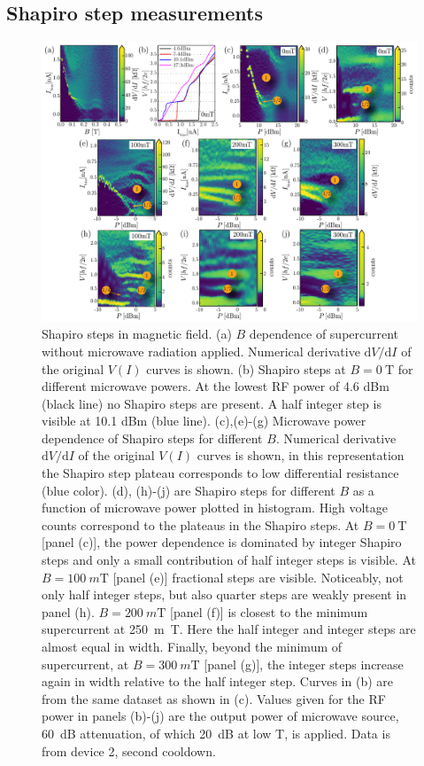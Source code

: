 \subsection{Shapiro step measurements}

\begin{figure}[!h]
\centering
\includegraphics[width=\textwidth]{chapter_supercurrent/figures/sup_fig2}
\caption{
Shapiro steps in magnetic field. 
(a) $B$ dependence of supercurrent without microwave radiation applied. 
Numerical derivative $\mathrm{d}V/\mathrm{d}{I}$ of the original $V\left(I\right)$ curves is shown. 
(b) Shapiro steps at $B = \SI{0}{\tesla}$ for different microwave powers. 
At the lowest RF power of 4.6 dBm (black line) no Shapiro steps are present. 
A half integer step is visible at 10.1 dBm (blue line). 
(c),(e)-(g) Microwave power dependence of Shapiro steps for different $B$. Numerical derivative $\mathrm{d}V/\mathrm{d}{I}$ of the original $V\left(I\right)$ curves is shown, in this representation the Shapiro step plateau corresponds to low differential resistance (blue color).
(d), (h)-(j) are Shapiro steps for different $B$ as a function of microwave power plotted in histogram. High voltage counts correspond to the plateaus in the Shapiro steps.
At $B = \SI{0}{\tesla}$ [panel (c)], the power dependence is dominated by integer Shapiro steps and only a small contribution of half integer steps is visible. 
At $B = \SI{100}{m\tesla}$ [panel (e)]  fractional steps are visible. Noticeably, not only half integer steps, but also quarter steps are weakly present in panel (h). 
$B = \SI{200}{m\tesla}$ [panel (f)] is closest to the minimum supercurrent at \SI{250}{m\tesla}. Here the half integer and integer steps are almost equal in width. 
Finally, beyond the minimum of supercurrent, at $B = \SI{300}{m\tesla}$ [panel (g)], the integer steps increase again in width relative to the half integer step.
Curves in (b) are from the same dataset as shown in (c). 
Values given for the RF power in panels (b)-(j) are the output power of microwave source, \SI{60}{\deci \bel} attenuation, of which \SI{20}{\deci \bel} at low T, is applied. 
Data is from device 2, second cooldown.}
\label{fig: shapiro}
\end{figure}

